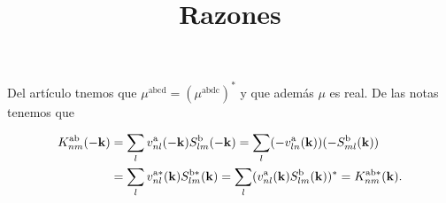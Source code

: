 \documentclass{article}
\title{Razones}
\date{}
\begin{document}
\maketitle

Del art\'iculo \cite{bhatPRL05} tnemos que
$\mu^{\mathrm{abcd}}=(\mu^{\mathrm{abdc}})^{*}$ y que
adem\'as $\mu$ es real. De las notas tenemos que 

\begin{align}\label{3.e} 
K^{\mathrm{a}\mathrm{b}}_{nm}(-\mathbf{k}) 
&=\sum_l v^{\mathrm{a}}_{nl}(-\mathbf{k}) S^{\mathrm{b}} _{lm} (-\mathbf{k}) 
=\sum_l (-v^{\mathrm{a}}_{ln}(\mathbf{k}))(- S^{\mathrm{b}} _{ml} (\mathbf{k}) )  
\nonumber\\
&=\sum_l  
v^{\mathrm{a} *}_{nl}(\mathbf{k})  
S^{\mathrm{b} *} _{lm} (\mathbf{k}) 
=\sum_l 
(v^{\mathrm{a}}_{nl}(\mathbf{k})  
S^{\mathrm{b}} _{lm} (\mathbf{k}))^*=K^{\mathrm{a}\mathrm{b} *}_{nm}(\mathbf{k}) 
.  
\end{align} 
\end{document}
